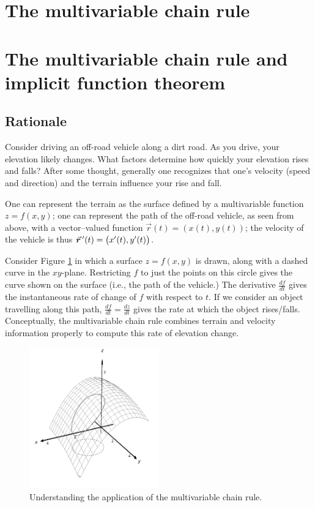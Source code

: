 \fi

\ifcalculus\section{The multivariable chain rule}\label{sec:multi_chain}\fi
\ifanalysis\section{The multivariable chain rule and  implicit function theorem}\label{sec:multi_chain}\fi
\subsection{Rationale}
Consider driving an off-road vehicle along a dirt road. As you drive, your elevation likely changes. What factors determine how quickly your elevation rises and falls? 
After some thought, generally one recognizes that one's velocity (speed and direction) and the terrain influence your rise and fall. 

One can represent the terrain as the surface defined by a multivariable function $z=f(x,y)$; one can represent the path of the off-road vehicle, as seen from above, with a vector--valued function \linebreak $\vec r(t) = \left( x(t), y(t)\right)$; the velocity of the vehicle is thus $\vrp(t) = \left( x'(t),y'(t)\right)$.

Consider Figure \ref{fig_multi_var_12} in which a surface $z=f(x,y)$ is drawn, along with a dashed curve in the $xy$-plane. Restricting $f$ to just the points on this circle gives the curve shown on the surface (i.e., the path of the vehicle.) The derivative $\frac{df}{dt}$ gives the instantaneous rate of change of $f$ with respect to $t$. If we consider an object travelling along this path, $\frac{df}{dt}=\frac{dz}{dt}$ gives the rate at which the object rises/falls. Conceptually, the multivariable chain rule combines terrain and velocity information properly to compute this rate of elevation change. 



\begin{figure}
	\begin{center}
			\includegraphics[width=0.5\textwidth]{fig_multi_var_12}
	\caption{Understanding the application of the multivariable chain rule.}
	\label{fig_multi_var_12}
	\end{center}
\end{figure}


